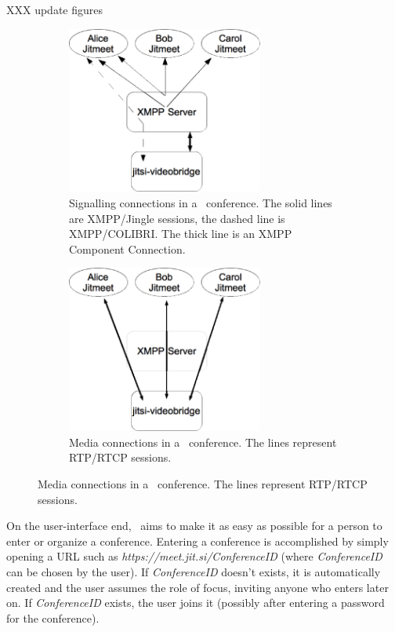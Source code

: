 \documentclass[twoside,openright,a4paper,11pt,english]{article}
\begin{document}
XXX update figures
\begin{figure}[h]
   \centering
        \begin{subfigure}[t]{0.4\textwidth}
            \includegraphics[height=5.5cm]{./pics/jm-sig.eps}
            \caption{Signalling connections in a \jm\ conference.
                The solid lines are XMPP/Jingle sessions, the dashed line
                is XMPP/COLIBRI. The thick line is an XMPP Component Connection.}
            \label{jitmeet-sig}
        \end{subfigure}
        \quad
        \quad
        \quad
        \begin{subfigure}[t]{0.4\textwidth}
            \includegraphics[height=5.5cm]{./pics/jm-med.eps}
            \caption{Media connections in a \jm\ conference. The
                lines represent RTP/RTCP sessions.}
            \label{jitmeet-med}
        \end{subfigure}
\end{figure}


\smallskip
On the user-interface end, \jm\ aims to make it as easy as possible for a
person to enter or organize a conference. 
Entering a conference is accomplished by simply opening a URL such as \emph{https://meet.jit.si/ConferenceID} 
(where \emph{ConferenceID} can be chosen by the user). If \emph{ConferenceID}
doesn't exists, it is automatically created and
the user assumes the role of focus, inviting anyone who enters later on. If
\emph{ConferenceID} exists,
the user joins it (possibly after entering a password for the conference).
\end{document}
